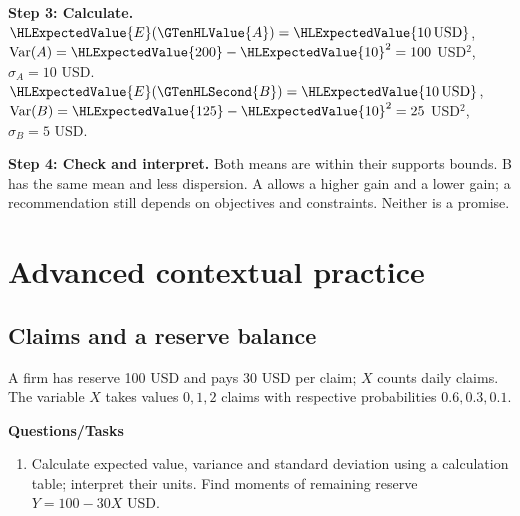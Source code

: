 \par\noindent\begin{minipage}{\linewidth}
\textbf{Step 3: Calculate.} $\HLExpectedValue{E}(\GTenHLValue{A})=\HLExpectedValue{10\,\text{USD}}$, $\operatorname{Var}(A)=\HLExpectedValue{200}-\HLExpectedValue{10}^2=100$ USD$^2$, $\sigma_A=10$ USD. $\HLExpectedValue{E}(\GTenHLSecond{B})=\HLExpectedValue{10\,\text{USD}}$, $\operatorname{Var}(B)=\HLExpectedValue{125}-\HLExpectedValue{10}^2=25$ USD$^2$, $\sigma_B=5$ USD.
\end{minipage}\par\medskip
\par\noindent\begin{minipage}{\linewidth}
\textbf{Step 4: Check and interpret.} Both means are within their supports bounds. B has the same mean and less dispersion. A allows a higher gain and a lower gain; a recommendation still depends on objectives and constraints. Neither  is a promise.
\end{minipage}\par\medskip
{}
\section{Advanced contextual practice}\label{sec:t2-c8-advanced}
\subsection{Claims and a reserve balance}
A firm has reserve 100 USD and pays 30 USD per claim; $X$ counts daily claims. The variable $X$ takes values $ 0, 1, 2$ claims with respective probabilities $ 0.6, 0.3, 0.1$.

\textbf{Questions/Tasks}
\begin{enumerate}
\item Calculate expected value, variance and standard deviation using a calculation table; interpret their units. Find moments of remaining reserve $Y=100-30X$ USD.
\end{enumerate}
